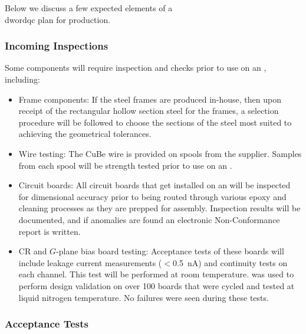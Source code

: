 Below we discuss a few expected elements of a \\dword{qc} plan for  production.   

\subsubsection{Incoming Inspections}

Some components will require inspection and  checks prior to use on an , including:

\begin{itemize}

\item Frame components: If the  steel frames are produced in-house, then upon receipt of the rectangular hollow section steel for the frames, a selection procedure will be followed to choose the sections of the steel most suited to achieving the geometrical tolerances. 

\item Wire testing: The CuBe wire is provided on spools from the supplier. Samples from each spool will be strength tested prior to use on an .

\item Circuit boards: All circuit boards that get installed on an  will be inspected for dimensional accuracy prior to being routed through various epoxy and cleaning processes as they are prepped for assembly. Inspection results will be documented, and if anomalies are found an electronic Non-Conformance report is written.  %

\item CR and $G$-plane bias board testing: Acceptance tests of these boards will include leakage current measurements ($<$\SI{0.5}{nA}) and continuity tests on each channel.  This test will be performed at room temperature.  was used to perform design validation on over 100 boards that were cycled and tested at liquid nitrogen temperature. No failures were seen during these tests. 

\end{itemize}

\subsubsection{ Acceptance Tests} 

